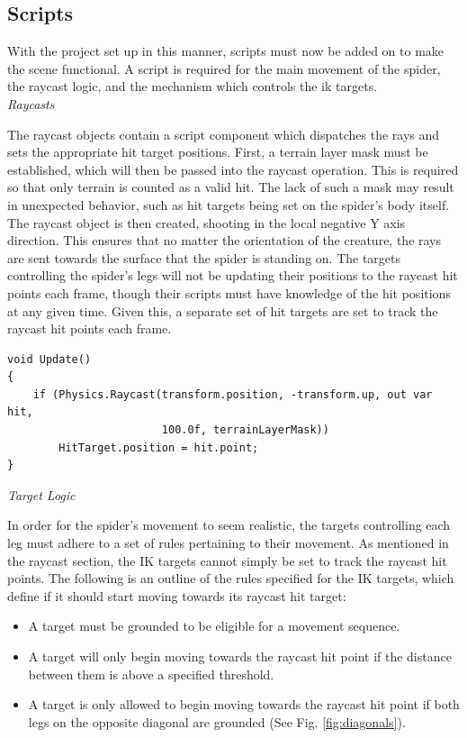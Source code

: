 \subsection{Scripts}
With the project set up in this manner, scripts must now be added on to make the
scene functional. A script is required for the main movement of the spider, the
raycast logic, and the mechanism which controls the ik targets.\\

\noindent\textit{Raycasts}

The raycast objects contain a script component which dispatches the rays and
sets the appropriate hit target positions. First, a terrain layer mask must be
established, which will then be passed into the raycast operation. This is
required so that only terrain is counted as a valid hit. The lack of such a mask
may result in unexpected behavior, such as hit targets being set on the spider's
body itself. The raycast object is then created, shooting in the local negative
Y axis direction. This ensures that no matter the orientation of the creature,
the rays are sent towards the surface that the spider is standing on. The
targets controlling the spider's legs will not be updating their positions to
the raycast hit points each frame, though their scripts must have knowledge of
the hit positions at any given time. Given this, a separate set of hit targets
are set to track the raycast hit points each frame.\\

\begin{lstlisting}[basicstyle=\linespread{0.9}\footnotesize\ttfamily, numbers=none,frame=single,
caption={Ray casts scanning for terrain. \textit{RayLogic.cs}},captionpos=t,
label=rays, language={[Sharp]c}, float=tp]
void Update()
{
    if (Physics.Raycast(transform.position, -transform.up, out var hit, 
                        100.0f, terrainLayerMask))
        HitTarget.position = hit.point;
}
\end{lstlisting}

\noindent\textit{Target Logic}

In order for the spider's movement to seem realistic, the targets controlling
each leg must adhere to a set of rules pertaining to their movement. As
mentioned in the raycast section, the IK targets cannot simply be set to track
the raycast hit points. The following is an outline of the rules specified for
the IK targets, which define if it should start moving towards its raycast hit
target:
\begin{itemize}
    \item A target must be grounded to be eligible for a movement sequence.

    \item A target will only begin moving towards the raycast hit point if the
        distance between them is above a specified threshold.

    \item A target is only allowed to begin moving towards the raycast hit
        point if both legs on the opposite diagonal are grounded (See Fig.
        \ref{fig:diagonals}).
\end{itemize}


